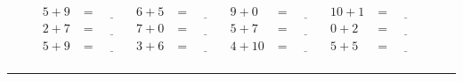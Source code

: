 \documentclass{article}
\begin{document}
\begin{sloppy}
\begin{align*}
    5 + 9 &= \underline{\hspace{1cm}} & 6 + 5 &= \underline{\hspace{1cm}} & 9 + 0 &= \underline{\hspace{1cm}} & 10 + 1 &= \underline{\hspace{1cm}} \\
    2 + 7 &= \underline{\hspace{1cm}} & 7 + 0 &= \underline{\hspace{1cm}} & 5 + 7 &= \underline{\hspace{1cm}} & 0 + 2 &= \underline{\hspace{1cm}} \\
    5 + 9 &= \underline{\hspace{1cm}} & 3 + 6 &= \underline{\hspace{1cm}} & 4 + 10 &= \underline{\hspace{1cm}} & 5 + 5 &= \underline{\hspace{1cm}} \\
\end{align*}
\hrule
\end{sloppy}
\end{document}
